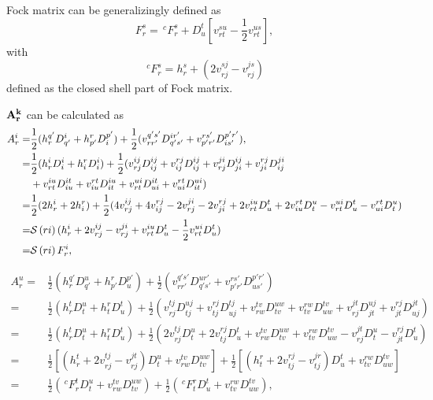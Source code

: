 \documentclass[a4paper,12pt,oneside]{book}
\newcommand{\sop}[1]{{\cal S}\left(#1\right)}
\newcommand{\pre}[1]{\,#1\!}
\begin{document}
Fock matrix can be generalizingly defined as 
\begin{equation}
  F_r^s = \pre{^c}F_r^s + D^t_u[v^{su}_{rt}-\frac{1}{2}v^{us}_{rt}],
\end{equation}
with 
\begin{equation}
  \pre{^c}F_r^s = h^s_r+(2v^{sj}_{rj}-v^{js}_{rj})
\end{equation}
defined as the closed shell part of Fock matrix.

$\bf{A}_r^k$ can be calculated as 
\begin{equation}
\begin{aligned}
  A_r^i=& \frac{1}{2}(h^{q'}_rD^i_{q'} + h^r_{p'}D^{p'}_i) + \frac{1}{2}(v^{q's'}_{rr'}D^{ir'}_{q's'}+v^{rs'}_{p'r'}D^{p'r'}_{is'}),\\
  =&\frac{1}{2}(h^i_rD^i_i+h^r_iD^i_i)+\frac{1}{2}(v^{ij}_{rj}D^{ij}_{ij}+v^{rj}_{ij}D^{ij}_{ij} +v^{ji}_{rj}D^{ij}_{ji} +v^{rj}_{ji}D^{ji}_{ij}\\
    &+ v^{iu}_{rt}D^{it}_{iu}+v_{iu}^{rt}D_{it}^{iu} + v^{ui}_{rt}D^{it}_{ui} + v^{rt}_{ui}D^{ui}_{it})\\
  =&\frac{1}{2}(2h^i_r+2h^r_i)+\frac{1}{2}(4v^{ij}_{rj}+4v^{rj}_{ij} -2v^{ji}_{rj} -2v^{rj}_{ji} + 2v^{iu}_{rt}D^t_u+2v_{iu}^{rt}D_t^u - v^{ui}_{rt}D^t_u - v^{rt}_{ui}D^u_t)\\
  =&\sop{ri}(h^i_r+2v^{ij}_{rj}-v^{ji}_{rj}+v^{iu}_{rt}D^t_u-\frac{1}{2}v^{ui}_{rt}D^t_u)\\
  =&\sop{ri} F_r^i,
\end{aligned}
\end{equation}

\begin{equation}
\begin{aligned}
  A_r^u=& \frac{1}{2}(h^{q'}_rD^u_{q'} + h^r_{p'}D^{p'}_u) + \frac{1}{2}(v^{q's'}_{rr'}D^{ur'}_{q's'}+v^{rs'}_{p'r'}D^{p'r'}_{us'})\\
  =&\frac{1}{2}(h^t_rD^u_t+h^r_tD^t_u) + \frac{1}{2}(v^{tj}_{rj}D^{uj}_{tj}+v^{rj}_{tj}D^{tj}_{uj}+v^{tv}_{rw}D^{uw}_{tv}+v^{rw}_{tv}D^{tv}_{uw}+v^{jt}_{rj}D^{uj}_{jt}+v^{rj}_{jt}D^{jt}_{uj})\\
  =&\frac{1}{2}(h^t_rD^u_t+h^r_tD^t_u) + \frac{1}{2}(2v^{tj}_{rj}D^u_t+2v^{rj}_{tj}D^t_u+v^{tv}_{rw}D^{uw}_{tv}+v^{rw}_{tv}D^{tv}_{uw}-v^{jt}_{rj}D^u_t-v^{rj}_{jt}D^t_u)\\
  =&\frac{1}{2}[(h^t_r + 2v^{tj}_{rj} - v^{jt}_{rj})D^u_t + v^{tv}_{rw}D^{uw}_{tv}] + \frac{1}{2}[(h^r_t + 2v^{rj}_{tj} - v^{jr}_{tj})D^t_u + v^{rw}_{tv}D^{tv}_{uw}]\\
  =&\frac{1}{2}(\pre{^c}F_r^tD^u_t+v^{tv}_{rw}D^{uw}_{tv}) + \frac{1}{2}(\pre{^c}F_t^rD^t_u+v^{rw}_{tv}D^{tv}_{uw}),\\
\end{aligned}
\end{equation}
\end{document}
